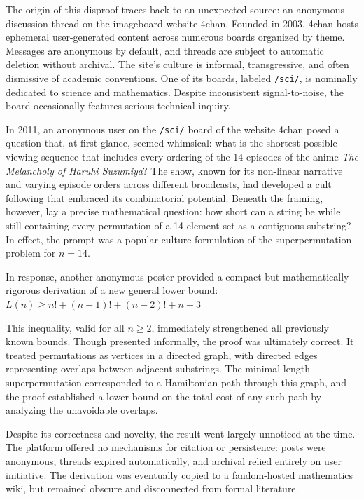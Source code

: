 The origin of this disproof traces back to an unexpected source: an anonymous discussion thread on the imageboard website 4chan. Founded in 2003, 4chan hosts ephemeral user-generated content across numerous boards organized by theme. Messages are anonymous by default, and threads are subject to automatic deletion without archival. The site's culture is informal, transgressive, and often dismissive of academic conventions. One of its boards, labeled \texttt{/sci/}, is nominally dedicated to science and mathematics. Despite inconsistent signal-to-noise, the board occasionally features serious technical inquiry.

In 2011, an anonymous user on the \texttt{/sci/} board of the website 4chan posed a question that, at first glance, seemed whimsical: what is the shortest possible viewing sequence that includes every ordering of the 14 episodes of the anime \emph{The Melancholy of Haruhi Suzumiya}? The show, known for its non-linear narrative and varying episode orders across different broadcasts, had developed a cult following that embraced its combinatorial potential. Beneath the framing, however, lay a precise mathematical question: how short can a string be while still containing every permutation of a 14-element set as a contiguous substring? In effect, the prompt was a popular-culture formulation of the superpermutation problem for $n = 14$.

In response, another anonymous poster provided a compact but mathematically rigorous derivation of a new general lower bound: $L(n) \geq n! + (n - 1)! + (n - 2)! + n - 3$

This inequality, valid for all $n \geq 2$, immediately strengthened all previously known bounds. Though presented informally, the proof was ultimately correct. It treated permutations as vertices in a directed graph, with directed edges representing overlaps between adjacent substrings. The minimal-length superpermutation corresponded to a Hamiltonian path through this graph, and the proof established a lower bound on the total cost of any such path by analyzing the unavoidable overlaps.

Despite its correctness and novelty, the result went largely unnoticed at the time. The platform offered no mechanisms for citation or persistence: posts were anonymous, threads expired automatically, and archival relied entirely on user initiative. The derivation was eventually copied to a fandom-hosted mathematics wiki, but remained obscure and disconnected from formal literature.

